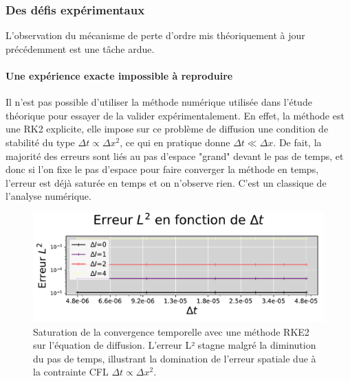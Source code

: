 \subsubsection{Des défis expérimentaux}
    L'observation du mécanisme de perte d'ordre mis théoriquement à jour précédemment 
    est une tâche ardue.
    \paragraph{Une expérience exacte impossible à reproduire}
        Il n'est pas possible d'utiliser la méthode numérique utilisée dans l'étude théorique pour essayer de la valider expérimentalement. 
        En effet, la méthode est une RK2 explicite, elle impose sur ce problème de diffusion une condition de stabilité du type $\Delta t \propto \Delta x^2$,
        ce qui en pratique donne $\Delta t \ll \Delta x$. De fait, la majorité des erreurs sont liés au pas d'espace "grand" devant le pas de temps, et donc
        si l'on fixe le pas d'espace pour faire converger la méthode en temps, l'erreur est déjà saturée en temps et on n'observe rien. 
        C'est un classique de l'analyse numérique.
        \begin{figure}[htbp]
            \centering
            \includegraphics[width=\textwidth]{media/4_travail/1_AMR/convergence/convergence_temps_SATURATION.pdf}
            \caption{Saturation de la convergence temporelle avec une méthode RKE2 sur l'équation de diffusion. 
                        L'erreur L² stagne malgré la diminution du pas de temps, illustrant la domination 
                        de l'erreur spatiale due à la contrainte CFL $\Delta t \propto \Delta x^2$.}
            \label{fig:saturation_rke2}
        \end{figure}
